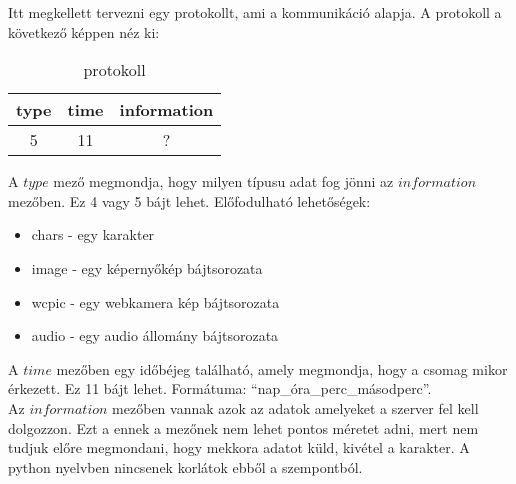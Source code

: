 \documentclass[a4paper, 11pt]{article}
\begin{document}

Itt megkellett tervezni egy protokollt, ami a kommunikáció alapja. A protokoll a következő képpen néz ki:
\begin{table}[H]
\centering
\label{tab:protocol}
\caption{protokoll}
\begin{tabular}{|c|c|c|}
\hline
\textbf{type} & \textbf{time} & \textbf{information} \\
\hline
5 & 11 & ? \\
\hline
\end{tabular}
\end{table}
A $type$ mező megmondja, hogy milyen típusu adat fog jönni az $information$ mezőben. Ez 4 vagy 5 bájt lehet. Előfodulható lehetőségek:
\begin{itemize}
\item chars - egy karakter
\item image - egy képernyőkép bájtsorozata
\item wcpic - egy webkamera kép bájtsorozata
\item audio - egy audio állomány bájtsorozata
\end{itemize}
A $time$ mezőben egy időbéjeg található, amely megmondja, hogy a csomag mikor érkezett. Ez 11 bájt lehet. Formátuma: ``nap\_óra\_perc\_másodperc''.\\
Az $information$ mezőben vannak azok az adatok amelyeket a szerver fel kell dolgozzon. Ezt a ennek a mezőnek nem lehet pontos méretet adni, mert nem tudjuk előre megmondani, hogy mekkora adatot küld, kivétel a karakter. A python nyelvben nincsenek korlátok ebből a szempontból.
\end{document}
